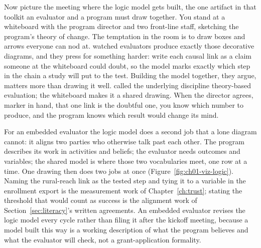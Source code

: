 \documentclass[
    a4paper,
    fontsize=10pt,
    twoside=true,
    numbers=noenddot,
]{kaobook}
\begin{document}
Now picture the meeting where the logic model gets built, the one artifact in that toolkit an evaluator and a program must draw together. You stand at a whiteboard with the program director and two front-line staff, sketching the program's theory of change. The temptation in the room is to draw boxes and arrows everyone can nod at. \textcite{funnell2011purposeful} watched evaluators produce exactly those decorative diagrams, and they press for something harder: write each causal link as a claim someone at the whiteboard could doubt, so the model marks exactly which step in the chain a study will put to the test. Building the model together, they argue, matters more than drawing it well. \textcite{weiss1998evaluation} called the underlying discipline theory-based evaluation; the whiteboard makes it a shared drawing. When the director agrees, marker in hand, that one link is the doubtful one, you know which number to produce, and the program knows which result would change its mind.

For an embedded evaluator the logic model does a second job that a lone diagram cannot: it aligns two parties who otherwise talk past each other. The program describes its work in activities and beliefs; the evaluator needs outcomes and variables; the shared model is where those two vocabularies meet, one row at a time. One drawing then does two jobs at once (Figure~\ref{fig:ch01-viz-logic}). Naming the rural-reach link as the tested step and tying it to a variable in the enrollment export is the measurement work of Chapter~\ref{ch:trust}; stating the threshold that would count as success is the alignment work of Section~\ref{sec:literacy}'s written agreements. An embedded evaluator revises the logic model every cycle rather than filing it after the kickoff meeting, because a model built this way is a working description of what the program believes and what the evaluator will check, not a grant-application formality.
\end{document}
